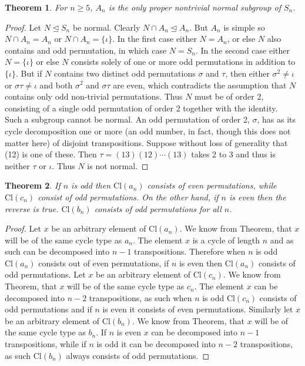 \documentclass[a4paper,10pt]{article}
\newtheorem{theorem}{Theorem}[section]
\theoremstyle{definition}
\begin{document}
\begin{theorem}
For $n \geq 5$, $A_n$ is the only proper nontrivial normal subgroup of $S_n$. 
\end{theorem}
\begin{proof}
Let $N \unlhd S_n$ be normal. Clearly $N\cap A_n \unlhd A_n$. But $A_n$ is simple so $N\cap A_n = A_n$ or $N\cap A_n = \{\iota\}$. In the first case either $N=A_n$, or else $N$ also contains and odd permutation, in which case $N=S_n$. In the second case either $N=\{\iota\}$ or else $N$ consists solely of one or more odd permutations in addition to $\{\iota\}$. But if $N$ contains two distinct odd permutations $\sigma$ and $\tau$, then either $\sigma^2 \neq \iota$ or $\sigma \tau \neq \iota$ and both $\sigma^2$ and $\sigma \tau$ are even, which contradicts the assumption that $N$ contains only odd non-trivial permutations. Thus $N$ must be of order 2, consisting of a single odd permutation of order 2 together with the identity. \\

Such a subgroup cannot be normal. An odd permutation of order 2, $\sigma$, has as its cycle decomposition one or more (an odd number, in fact, though this does not matter here) of disjoint transpositions. Suppose without loss of generality that (12) is one of these. Then $\tau = (13)(12)\cdots(13)$ takes 2 to 3 and thus is neither $\tau$ or $\iota$. Thus $N$ is not normal.
\end{proof}

\begin{theorem}
If $n$ is odd then $\textrm{Cl}(a_n)$ consists of even permutations, while $\textrm{Cl}(c_n)$ consist of odd permutations. On the other hand, if $n$ is even then the reverse is true. $\textrm{Cl}(b_n)$ consists of odd permutations for all $n$.     
\end{theorem}
\begin{proof}
Let $x$ be an arbitrary element of $\textrm{Cl}(a_n)$. We know from Theorem, that $x$ will be of the same cycle type as $a_n$. The element $x$ is a cycle of length $n$ and as such can be decomposed into $n-1$ transpositions. Therefore when $n$ is odd $\textrm{Cl}(a_n)$ consists out of even permutations, if $n$ is even then $\textrm{Cl}(a_n)$ consists of odd permutations. Let $x$ be an arbitrary element of $\textrm{Cl}(c_n)$. We know from Theorem, that $x$ will be of the same cycle type as $c_n$. The element $x$ can be decomposed into $n-2$ transpositions, as such when $n$ is odd $\textrm{Cl}(c_n)$ consists of odd permutations and if $n$ is even it consists of even permutations. Similarly let $x$ be an arbitrary element of $\textrm{Cl}(b_n)$. We know from Theorem, that $x$ will be of the same cycle type as $b_n$. If $n$ is even $x$ can be decomposed into $n-1$ transpositions, while if $n$ is odd it can be decomposed into $n-2$ transpositions, as such $\textrm{Cl}(b_n)$ always consists of odd permutations.     
\end{proof}
\end{document}
